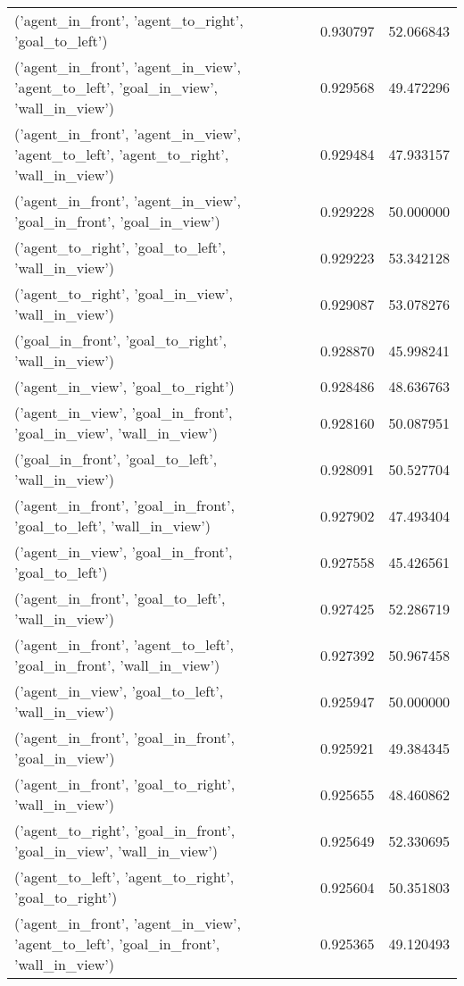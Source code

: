 \begin{tabular}{lrr}
('agent\_in\_front', 'agent\_to\_right', 'goal\_to\_left') & 0.930797 & 52.066843 \\
('agent\_in\_front', 'agent\_in\_view', 'agent\_to\_left', 'goal\_in\_view', 'wall\_in\_view') & 0.929568 & 49.472296 \\
('agent\_in\_front', 'agent\_in\_view', 'agent\_to\_left', 'agent\_to\_right', 'wall\_in\_view') & 0.929484 & 47.933157 \\
('agent\_in\_front', 'agent\_in\_view', 'goal\_in\_front', 'goal\_in\_view') & 0.929228 & 50.000000 \\
('agent\_to\_right', 'goal\_to\_left', 'wall\_in\_view') & 0.929223 & 53.342128 \\
('agent\_to\_right', 'goal\_in\_view', 'wall\_in\_view') & 0.929087 & 53.078276 \\
('goal\_in\_front', 'goal\_to\_right', 'wall\_in\_view') & 0.928870 & 45.998241 \\
('agent\_in\_view', 'goal\_to\_right') & 0.928486 & 48.636763 \\
('agent\_in\_view', 'goal\_in\_front', 'goal\_in\_view', 'wall\_in\_view') & 0.928160 & 50.087951 \\
('goal\_in\_front', 'goal\_to\_left', 'wall\_in\_view') & 0.928091 & 50.527704 \\
('agent\_in\_front', 'goal\_in\_front', 'goal\_to\_left', 'wall\_in\_view') & 0.927902 & 47.493404 \\
('agent\_in\_view', 'goal\_in\_front', 'goal\_to\_left') & 0.927558 & 45.426561 \\
('agent\_in\_front', 'goal\_to\_left', 'wall\_in\_view') & 0.927425 & 52.286719 \\
('agent\_in\_front', 'agent\_to\_left', 'goal\_in\_front', 'wall\_in\_view') & 0.927392 & 50.967458 \\
('agent\_in\_view', 'goal\_to\_left', 'wall\_in\_view') & 0.925947 & 50.000000 \\
('agent\_in\_front', 'goal\_in\_front', 'goal\_in\_view') & 0.925921 & 49.384345 \\
('agent\_in\_front', 'goal\_to\_right', 'wall\_in\_view') & 0.925655 & 48.460862 \\
('agent\_to\_right', 'goal\_in\_front', 'goal\_in\_view', 'wall\_in\_view') & 0.925649 & 52.330695 \\
('agent\_to\_left', 'agent\_to\_right', 'goal\_to\_right') & 0.925604 & 50.351803 \\
('agent\_in\_front', 'agent\_in\_view', 'agent\_to\_left', 'goal\_in\_front', 'wall\_in\_view') & 0.925365 & 49.120493 \\

\end{tabular}
